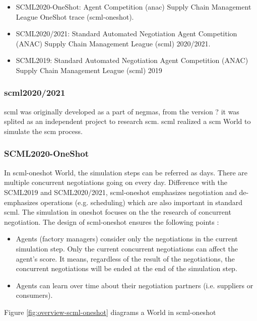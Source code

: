 \begin{itemize}
	\item SCML2020-OneShot: Agent Competition (\gls{anac}) Supply Chain Management League OneShot trace (\gls{scml-oneshot}).
	\item SCML2020/2021: Standard Automated Negotiation Agent Competition (ANAC) Supply Chain Management League (\gls{scml}) 2020/2021.
	\item SCML2019: Standard Automated Negotiation Agent Competition (ANAC) Supply Chain Management League (\gls{scml}) 2019
\end{itemize}

\subsubsection{\gls{scml}2020/2021}
\gls{scml} was originally developed as a part of \gls{negmas}, from the version ? it was splited as an independent project to research \gls{scm}. \gls{scml} realized a \gls{scm} World to simulate the \gls{scm} process.  

\subsubsection{SCML2020-OneShot} 
In \gls{scml-oneshot} World, the simulation steps can be referred as days. There are multiple concurrent negotiations going on every day. Difference with the SCML2019 and SCML2020/2021, \gls{scml-oneshot} emphasizes negotiation and de-emphasizes operations (e.g. scheduling) which are also important in standard scml. The simulation in oneshot focuses on the the research of concurrent negotiation. The design of \gls{scml-oneshot} ensures the following points \parencite{Mohammad2021}:

\begin{itemize}
	\item Agents (factory managers) consider only the negotiations in the current simulation step. Only the current concurrent negotiations can affect the agent's score. It means, regardless of the result of the negotiations, the concurrent negotiations will be ended at the end of the simulation step. 
	\item Agents can learn over time about their negotiation partners (i.e. suppliers or consumers).
\end{itemize} 

Figure \ref{fig:overview-scml-oneshot} diagrams a World in \gls{scml-oneshot}

